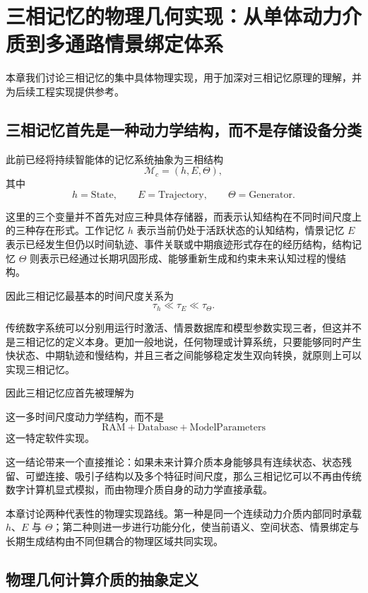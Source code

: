 \chapter{三相记忆的物理几何实现：从单体动力介质到多通路情景绑定体系}
本章我们讨论三相记忆的集中具体物理实现，用于加深对三相记忆原理的理解，并为后续工程实现提供参考。
\section{三相记忆首先是一种动力学结构，而不是存储设备分类}

此前已经将持续智能体的记忆系统抽象为三相结构
\[
\mathcal{M}_c=(h,E,\Theta),
\]
其中
\[
h=\mathrm{State},
\qquad
E=\mathrm{Trajectory},
\qquad
\Theta=\mathrm{Generator}.
\]

这里的三个变量并不首先对应三种具体存储器，而表示认知结构在不同时间尺度上的三种存在形式。工作记忆 $h$ 表示当前仍处于活跃状态的认知结构，情景记忆 $E$ 表示已经发生但仍以时间轨迹、事件关联或中期痕迹形式存在的经历结构，结构记忆 $\Theta$ 则表示已经通过长期巩固形成、能够重新生成和约束未来认知过程的慢结构。

因此三相记忆最基本的时间尺度关系为
\[
\tau_h \ll \tau_E \ll \tau_\Theta.
\]

传统数字系统可以分别用运行时激活、情景数据库和模型参数实现三者，但这并不是三相记忆的定义本身。更加一般地说，任何物理或计算系统，只要能够同时产生快状态、中期轨迹和慢结构，并且三者之间能够稳定发生双向转换，就原则上可以实现三相记忆。

因此三相记忆应首先被理解为
\begin{statementbox}
\centering
{}
\end{statementbox}
这一多时间尺度动力学结构，而不是
\[
\mathrm{RAM}
+
\mathrm{Database}
+
\mathrm{ModelParameters}
\]
这一特定软件实现。

这一结论带来一个直接推论：如果未来计算介质本身能够具有连续状态、状态残留、可塑连接、吸引子结构以及多个特征时间尺度，那么三相记忆可以不再由传统数字计算机显式模拟，而由物理介质自身的动力学直接承载。

本章讨论两种代表性的物理实现路线。第一种是同一个连续动力介质内部同时承载 $h$、$E$ 与 $\Theta$；第二种则进一步进行功能分化，使当前语义、空间状态、情景绑定与长期生成结构由不同但耦合的物理区域共同实现。

\section{物理几何计算介质的抽象定义}

